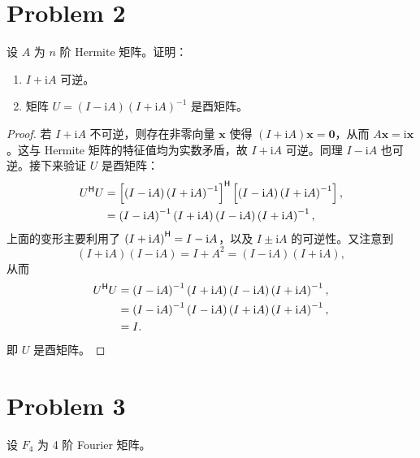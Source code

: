 \section*{Problem 2}

设 $A$ 为 $n$ 阶 Hermite 矩阵。证明：
\begin{enumerate}
    \item $I + \mathrm{i}A$ 可逆。
    \item 矩阵 $U = (I - \mathrm{i}A)(I + \mathrm{i}A)^{-1}$ 是酉矩阵。
\end{enumerate}

\begin{proof}
    若 $I + \mathrm{i}A$ 不可逆，则存在非零向量 $\bm x$ 使得 $(I+\mathrm{i}A)\bm x=\bm0$，从而 $A\bm x=\mathrm{i}\bm x$。这与 Hermite 矩阵的特征值均为实数矛盾，故 $I+\mathrm{i}A$ 可逆。同理 $I-\mathrm{i}A$ 也可逆。接下来验证 $U$ 是酉矩阵：
    \[
        \begin{aligned}
            U^{\mathsf{H}} U &= \left[\left(I - \mathrm{i}A\right)\left(I + \mathrm{i}A\right)^{-1}\right]^{\mathsf{H}} \left[\left(I - \mathrm{i}A\right)\left(I + \mathrm{i}A\right)^{-1}\right], \\
            &= \left(I - \mathrm{i}A\right)^{-1} \left(I + \mathrm{i}A\right) \left(I - \mathrm{i}A\right) \left(I + \mathrm{i}A\right)^{-1}, \\
        \end{aligned}
    \]
    上面的变形主要利用了 $\left(I + \mathrm{i}A\right)^{\mathsf{H}} = I - \mathrm{i}A$，以及 $I \pm \mathrm{i}A$ 的可逆性。又注意到 \[\left(I + \mathrm{i}A\right)\left(I - \mathrm{i}A\right) = I + A^2 = \left(I - \mathrm{i}A\right)\left(I + \mathrm{i}A\right),\]
    从而 \[
        \begin{aligned}
            U^{\mathsf{H}} U &= \left(I - \mathrm{i}A\right)^{-1} \left(I + \mathrm{i}A\right) \left(I - \mathrm{i}A\right) \left(I + \mathrm{i}A\right)^{-1}, \\
            &= \left(I - \mathrm{i}A\right)^{-1} \left(I - \mathrm{i}A\right) \left(I + \mathrm{i}A\right) \left(I + \mathrm{i}A\right)^{-1}, \\
            &= I.
        \end{aligned}
    \]
    即 $U$ 是酉矩阵。
\end{proof}

\section*{Problem 3}

设 $F_4$ 为 4 阶 Fourier 矩阵。

